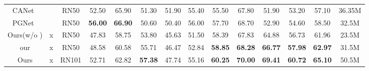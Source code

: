 \documentclass[runningheads]{llncs}
\begin{document}
\begin{table*}[t]
{\begin{tabular}{c|c|c|ccccc|ccccc|c}
			\hline
			CANet~\cite{zhang2019canet}    &\checkmark&RN50       &52.50&65.90&51.30&51.90&{\color[rgb]{0.7725,0.3529,0.06667}55.40}  &55.50&67.80&51.90&53.20&{\color[rgb]{0.7725,0.3529,0.06667}57.10} &36.35M\\ 
			PGNet~\cite{zhang2019pyramid}     &\checkmark&RN50    &\textbf{56.00}&\textbf{66.90}&50.60&50.40&{\color[rgb]{0.7725,0.3529,0.06667}56.00}  &57.70&68.70&52.90&54.60&{\color[rgb]{0.7725,0.3529,0.06667}58.50} &32.5M\\ 
			\hline
			Ours(w/o \textbf{})      &x&RN50        &47.83&58.75&53.80&45.63&{\color[rgb]{0.7725,0.3529,0.06667}51.50}  &58.39&67.83&64.88&56.73&{\color[rgb]{0.7725,0.3529,0.06667}61.96} &23.5M\\
			our                                    &x&RN50        &48.58&60.58&55.71&46.47&{\color[rgb]{0.7725,0.3529,0.06667}52.84}  &\textbf{58.85}&\textbf{68.28}&\textbf{66.77}&\textbf{57.98}&{\color[rgb]{0.7725,0.3529,0.06667}\textbf{62.97}} &31.5M\\
			Ours                                    &x&RN101       &52.71&62.82&\textbf{57.38}&47.74&{\color[rgb]{0.7725,0.3529,0.06667}55.16}  &\textbf{60.25}&\textbf{70.00}&\textbf{69.41}&\textbf{60.72}&{\color[rgb]{0.7725,0.3529,0.06667}\textbf{65.10}}&50.5M \\
			\hline
			\hline
	\end{tabular}}
\end{table*}
	
\end{document}
